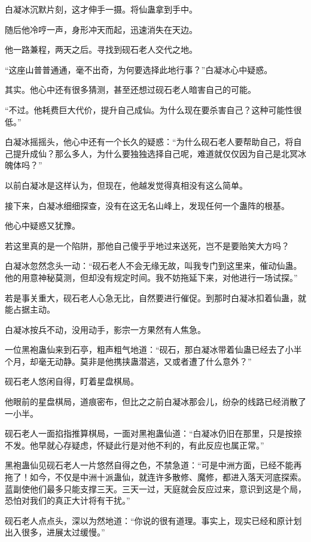 \begin{this_body}
白凝冰沉默片刻，这才伸手一摄。将仙蛊拿到手中。

随后他冷哼一声，身形冲天而起，迅速消失在天边。

他一路兼程，两天之后。寻找到砚石老人交代之地。

“这座山普普通通，毫不出奇，为何要选择此地行事？”白凝冰心中疑惑。

其实。他心中还有很多猜测，甚至还想过砚石老人暗害自己的可能。

“不过。他耗费巨大代价，提升自己成仙。为什么现在要杀害自己？这种可能性很低。”

白凝冰摇摇头，他心中还有一个长久的疑惑：“为什么砚石老人要帮助自己，将自己提升成仙？那么多人，为什么要独独选择自己呢，难道就仅仅因为自己是北冥冰魄体吗？”

以前白凝冰是这样认为，但现在，他越发觉得真相没有这么简单。

接下来，白凝冰细细探查，没有在这无名山峰上，发现任何一个蛊阵的根基。

他心中疑惑又犹豫。

若这里真的是一个陷阱，那他自己傻乎乎地过来送死，岂不是要贻笑大方吗？

白凝冰忽然念头一动：“砚石老人不会无缘无故，叫我专门到这里来，催动仙蛊。他的用意神秘莫测，但却没有规定时间。我不妨拖延下来，对他进行一场试探。”

若是事关重大，砚石老人心急无比，自然要进行催促。到那时白凝冰扣着仙蛊，就能占据主动。

白凝冰按兵不动，没用动手，影宗一方果然有人焦急。

一位黑袍蛊仙来到石亭，粗声粗气地道：“砚石，那白凝冰带着仙蛊已经去了小半个月，却毫无动静。莫非是他携挟蛊潜逃，又或者遭了什么意外？”

砚石老人悠闲自得，盯着星盘棋局。

他眼前的星盘棋局，道痕密布，但比之之前白凝冰那会儿，纷杂的线路已经消散了一小半。

砚石老人一面掐指推算棋局，一面对黑袍蛊仙道：“白凝冰仍旧在那里，只是按捺不发。他早就心存疑虑，怀疑此行是对他不利的，有此反应也属正常。”

黑袍蛊仙见砚石老人一片悠然自得之色，不禁急道：“可是中洲方面，已经不能再拖了！如今，不仅是中洲十派蛊仙，就连许多散修、魔修，都进入落天河底探索。蓝副使他们最多只能支撑三天。三天一过，天庭就会反应过来，意识到这是个局，恐怕对我们的真正大计将有干扰。”

砚石老人点点头，深以为然地道：“你说的很有道理。事实上，现实已经和原计划出入很多，进展太过缓慢。”


\end{this_body}

